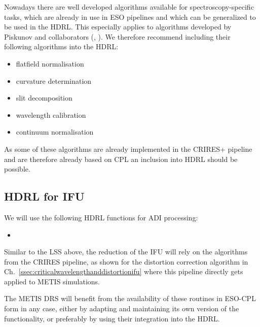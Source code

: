 Nowadays there are well developed algorithms available for spectroscopy-specific tasks, which are already in use in ESO pipelines and which can be generalized to be used in the \ac{HDRL}. This especially applies to algorithms developed by Piskunov and collaborators (\cite{pis21}, \cite{pis02}). We therefore recommend including their following algorithms into the \ac{HDRL}:
\begin{itemize}
    \item flatfield normalisation
    \item curvature determination
    \item slit decomposition
    \item wavelength calibration
    \item continuum normalisation
\end{itemize}
As some of these algorithms are already implemented in the \ac{CRIRES}+ pipeline
and are therefore already based on \ac{CPL} an inclusion into \ac{HDRL} should
be possible.

\subsection{HDRL for IFU}
\label{ssec:hdrllms}

We will use the following HDRL functions for ADI processing:
\begin{itemize}
    \item {}
\end{itemize}

Similar to the LSS above, the reduction of the IFU will rely on the algorithms
from the \ac{CRIRES} pipeline, as shown for the distortion correction algorithm
in Ch.~\ref{ssec:criticalwavelengthanddistortionifu} where this pipeline
directly gets applied to METIS simulations.

The METIS \ac{DRS} will benefit from the availability of these routines in ESO-CPL
form in any case, either by adapting and maintaining its own version of the
functionality, or preferably by using their integration into the HDRL.

